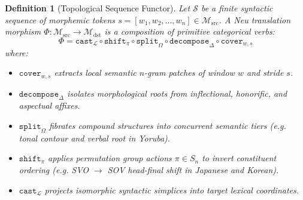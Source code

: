 \documentclass[11pt]{article}
\newtheorem{definition}{Definition}
\begin{document}
\begin{definition}[Topological Sequence Functor]
Let $\mathcal{S}$ be a finite syntactic sequence of morphemic tokens $s = [w_1, w_2, \dots, w_n] \in \mathcal{M}_{\text{src}}$. A Neu translation morphism $\Phi: \mathcal{M}_{\text{src}} \to \mathcal{M}_{\text{dst}}$ is a composition of primitive categorical verbs:
\begin{equation}
\Phi = \mathtt{cast}_{\mathcal{L}} \circ \mathtt{shift}_{\pi} \circ \mathtt{split}_{\Omega} \circ \mathtt{decompose}_{\Delta} \circ \mathtt{cover}_{w,s}
\end{equation}
where:
\begin{itemize}
    \item $\mathtt{cover}_{w,s}$ extracts local semantic $n$-gram patches of window $w$ and stride $s$.
    \item $\mathtt{decompose}_{\Delta}$ isolates morphological roots from inflectional, honorific, and aspectual affixes.
    \item $\mathtt{split}_{\Omega}$ fibrates compound structures into concurrent semantic tiers (e.g. tonal contour and verbal root in Yoruba).
    \item $\mathtt{shift}_{\pi}$ applies permutation group actions $\pi \in S_n$ to invert constituent ordering (e.g. SVO $\to$ SOV head-final shift in Japanese and Korean).
    \item $\mathtt{cast}_{\mathcal{L}}$ projects isomorphic syntactic simplices into target lexical coordinates.
\end{itemize}
\end{definition}
\end{document}
